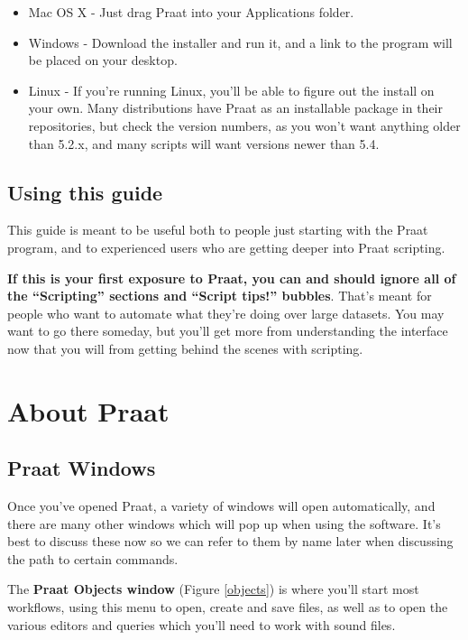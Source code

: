 \begin{itemize}
\item
  Mac OS X - Just drag Praat into your Applications folder.
\item
  Windows - Download the installer and run it, and a link to the program
  will be placed on your desktop.
\item
  Linux - If you're running Linux, you'll be able to figure out the
  install on your own. Many distributions have Praat as an installable
  package in their repositories, but check the version numbers, as you
  won't want anything older than 5.2.x, and many scripts will want
  versions newer than 5.4.
\end{itemize}

\hypertarget{using-this-guide}{%
\subsection{Using this guide}\label{using-this-guide}}

This guide is meant to be useful both to people just starting with the
Praat program, and to experienced users who are getting deeper into
Praat scripting.

\textbf{If this is your first exposure to Praat, you can and should
ignore all of the ``Scripting'' sections and ``Script tips!'' bubbles}.
That's meant for people who want to automate what they're doing over
large datasets. You may want to go there someday, but you'll get more
from understanding the interface now that you will from getting behind
the scenes with scripting.

\hypertarget{about-praat}{%
\section{About Praat}\label{about-praat}}

\hypertarget{praat-windows}{%
\subsection{Praat Windows}\label{praat-windows}}

Once you've opened Praat, a variety of windows will open automatically,
and there are many other windows which will pop up when using the
software. It's best to discuss these now so we can refer to them by name
later when discussing the path to certain commands.

The \textbf{Praat Objects window} (Figure \ref{objects}) is where you'll
start most workflows, using this menu to open, create and save files, as
well as to open the various editors and queries which you'll need to
work with sound files.

